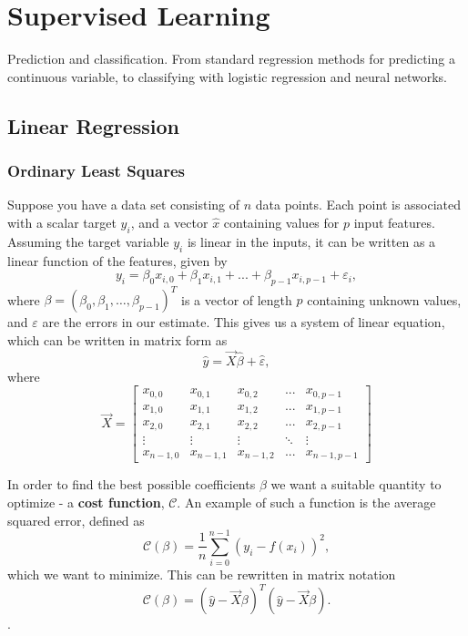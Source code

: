 \section{Supervised Learning}
Prediction and classification. From standard regression methods for predicting
a continuous variable, to classifying with logistic regression and neural
networks.

\subsection{Linear Regression}
\subsubsection{Ordinary Least Squares}\label{section:ols}
Suppose you have a data set consisting of $n$ data points. Each point is associated
with a scalar target $y_i$, and a vector $\hat{x}$ containing values for $p$ input
features. Assuming the target variable $y_i$ is linear in the inputs, it can be
written as a linear function of the features, given by
\begin{equation}\label{eq:ols-target}
y_i = \beta_0 x_{i,0} + \beta_1 x_{i,1} + ... + \beta_{p-1} x_{i, p-1} + \varepsilon_i,
\end{equation}
where $\beta = (\beta_0, \beta_1, \dots, \beta_{p-1})^T$ is a vector of length
$p$ containing unknown values, and $\varepsilon$ are the errors in our estimate.
This gives us a system of linear equation, which can be written in matrix form as
\begin{equation}\label{eq:ols-target-mat}
  \hat{y} = \vec{X}\hat{\beta} + \hat{\varepsilon},
\end{equation}
where
\begin{equation}
\vec{X} = \left[
\begin{matrix}
x_{0,0} & x_{0,1} & x_{0,2} & ... & x_{0,p-1}\\
x_{1,0} & x_{1,1} & x_{1,2} & ... & x_{1,p-1}\\
x_{2,0} & x_{2,1} & x_{2,2} & ... & x_{2,p-1}\\
\vdots & \vdots & \vdots & \ddots & \vdots\\
x_{n-1,0} & x_{n-1,1} & x_{n-1,2} & ... & x_{n-1,p-1}
\end{matrix}
\right]
\end{equation}

In order to find the best possible coefficients $\beta$ we want a suitable
quantity to optimize - a \textbf{cost function}, $\mathcal{C}$. An example of such a
function is the average squared error, defined as
\begin{equation}
	\mathcal{C}(\beta) = \frac{1}{n}\sum\limits_{i=0}^{n-1} (y_i - f(x_i))^2,
\end{equation}
which we want to minimize.
This can be rewritten in matrix notation
\begin{equation}
	\mathcal{C}(\beta) = (\hat{y}-\vec{X}\beta)^T(\hat{y} - \vec{X}\beta).
\end{equation}.

